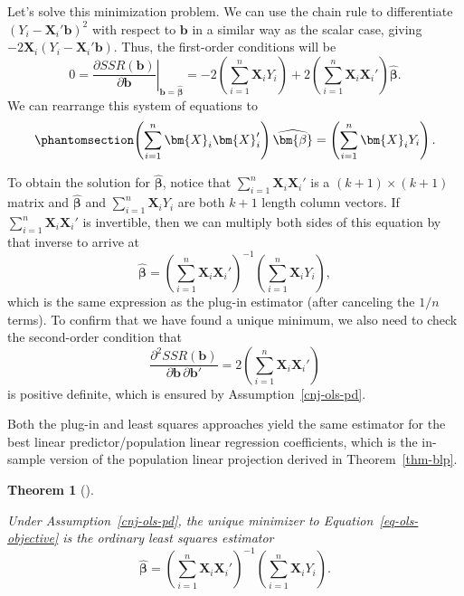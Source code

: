 \documentclass[
  13pt,
  letterpaper,
  DIV=11,
  numbers=noendperiod]{scrreprt}
\newcommand{\mb}{\bm}
\newcommand{\X}{\mb{X}}
\newcommand{\bhat}{\widehat{\mb{\beta}}}
\theoremstyle{plain}
\newtheorem{theorem}{Theorem}[chapter]
\theoremstyle{plain}
\theoremstyle{definition}
\theoremstyle{definition}
\theoremstyle{remark}
\begin{document}
Let's solve this minimization problem. We can use the chain rule to
differentiate \((Y_i - \X_i'\mb{b})^2\) with respect to \(\mb{b}\) in a
similar way as the scalar case, giving \(-2\X_i(Y_i - \X_i'\mb{b})\).
Thus, the first-order conditions will be \[ 
0= \left.\frac{\partial SSR(\mb{b})}{\partial \mb{b}}\right|_{\mb{b}=\bhat} = -2 \left(\sum_{i=1}^{n} \X_{i}Y_{i}\right) + 2\left(\sum_{i=1}^{n}\X_{i}\X_{i}'\right)\bhat.
\] We can rearrange this system of equations to
\begin{equation}\protect\phantomsection\label{eq-normal-equations}{ 
\left(\sum_{i=1}^{n}\X_{i}\X_{i}'\right)\bhat = \left(\sum_{i=1}^{n} \X_{i}Y_{i}\right).
}\end{equation}

To obtain the solution for \(\bhat\), notice that
\(\sum_{i=1}^{n}\X_{i}\X_{i}'\) is a \((k+1) \times (k+1)\) matrix and
\(\bhat\) and \(\sum_{i=1}^{n} \X_{i}Y_{i}\) are both \(k+1\) length
column vectors. If \(\sum_{i=1}^{n}\X_{i}\X_{i}'\) is invertible, then
we can multiply both sides of this equation by that inverse to arrive at
\[ 
\bhat = \left(\sum_{i=1}^n \X_i\X_i' \right)^{-1} \left(\sum_{i=1}^n \X_{i}Y_{i} \right),
\] which is the same expression as the plug-in estimator (after
canceling the \(1/n\) terms). To confirm that we have found a unique
minimum, we also need to check the second-order condition that \[ 
 \frac{\partial^{2} SSR(\mb{b})}{\partial \mb{b}\,\partial\mb{b}'} = 2\left(\sum_{i=1}^{n}\X_{i}\X_{i}'\right)
\] is positive definite, which is ensured by
Assumption~\ref{cnj-ols-pd}.

Both the plug-in and least squares approaches yield the same estimator
for the best linear predictor/population linear regression coefficients,
which is the in-sample version of the population linear projection
derived in Theorem~\ref{thm-blp}.

\begin{theorem}[]\protect\hypertarget{thm-ols}{}\label{thm-ols}

Under Assumption~\ref{cnj-ols-pd}, the unique minimizer to
Equation~\ref{eq-ols-objective} is the ordinary least squares estimator
\[
\bhat = \left(\sum_{i=1}^n \X_i\X_i' \right)^{-1} \left(\sum_{i=1}^n \X_{i}Y_{i} \right).
\]

\end{theorem}
\end{document}
